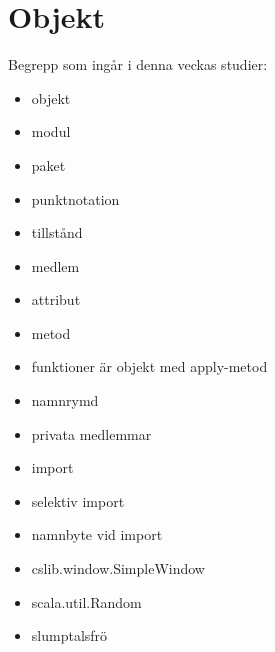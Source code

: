\chapter{Objekt}\label{chapter:W04}
Begrepp som ingår i denna veckas studier:
\begin{itemize}[noitemsep,label={$\square$},leftmargin=*]
\item objekt
\item modul
\item paket
\item punktnotation
\item tillstånd
\item medlem
\item attribut
\item metod
\item funktioner är objekt med apply-metod
\item namnrymd
\item privata medlemmar
\item import
\item selektiv import
\item namnbyte vid import
\item cslib.window.SimpleWindow
\item scala.util.Random
\item slumptalsfrö\end{itemize}

